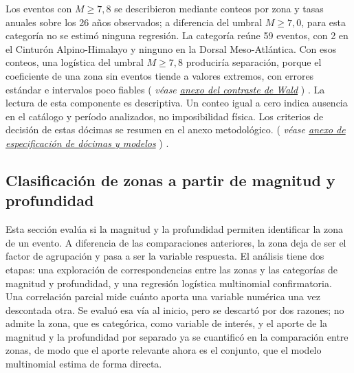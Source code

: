 \documentclass[
  spanish,
  letterpaper,
  DIV=11,
  numbers=noendperiod]{scrartcl}
\newcommand{\asesoriaParenRef}[1]{%
  \textnormal{\textcolor{asesoriaTextColor}{(}}%
  {\hypersetup{linkcolor=asesoriaLinkColor,urlcolor=asesoriaLinkColor,citecolor=asesoriaLinkColor}\textcolor{asesoriaTextColor}{\emph{#1}}}%
  \textnormal{\textcolor{asesoriaTextColor}{)}}%
}
\begin{document}
Los eventos con \(M \geq 7{,}8\) se describieron mediante conteos por
zona y tasas anuales sobre los 26 años observados; a diferencia del
umbral \(M \geq 7{,}0\), para esta categoría no se estimó ninguna
regresión. La categoría reúne 59 eventos, con 2 en el Cinturón
Alpino-Himalayo y ninguno en la Dorsal Meso-Atlántica. Con esos conteos,
una logística del umbral \(M \geq 7{,}8\) produciría separación, porque
el coeficiente de una zona sin eventos tiende a valores extremos, con
errores estándar e intervalos poco fiables
\asesoriaParenRef{véase \hyperref[sec-anexo-wald]{anexo del contraste de Wald}}.
La lectura de esta componente es descriptiva. Un conteo igual a cero
indica ausencia en el catálogo y período analizados, no imposibilidad
física. Los criterios de decisión de estas dócimas se resumen en el
anexo metodológico.
\asesoriaParenRef{véase \hyperref[sec-anexo-especificacion]{anexo de especificación de dócimas y modelos}}.

\subsection{Clasificación de zonas a partir de magnitud y
profundidad}\label{sec-met-clasificacion}

Esta sección evalúa si la magnitud y la profundidad permiten identificar
la zona de un evento. A diferencia de las comparaciones anteriores, la
zona deja de ser el factor de agrupación y pasa a ser la variable
respuesta. El análisis tiene dos etapas: una exploración de
correspondencias entre las zonas y las categorías de magnitud y
profundidad, y una regresión logística multinomial confirmatoria. Una
correlación parcial mide cuánto aporta una variable numérica una vez
descontada otra. Se evaluó esa vía al inicio, pero se descartó por dos
razones; no admite la zona, que es categórica, como variable de interés,
y el aporte de la magnitud y la profundidad por separado ya se
cuantificó en la comparación entre zonas, de modo que el aporte
relevante ahora es el conjunto, que el modelo multinomial estima de
forma directa.
\end{document}
